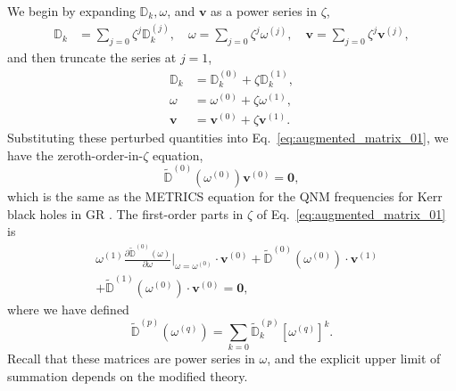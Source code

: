 \documentclass[aps,prx,amsmath,floats,floatfix,twocolumn,
  superscriptaddress,nofootinbib,showpacs]{revtex4-1}
\begin{document}
We begin by expanding $\mathbb{D}_k, \omega$, and $\textbf{v}$ as a power series in $\zeta$, 
\begin{equation}\label{eq:eigenperturbation_01}
\begin{split}
\mathbb{D}_k & = \sum_{j=0} \zeta^j \mathbb{D}^{(j)}_k, \quad
\omega  = \sum_{j=0} \zeta^j \omega^{(j)}, 
\quad
\textbf{v} = \sum_{j=0} \zeta^j \textbf{v}^{(j)}, 
\end{split}
\end{equation}
and then truncate the series at $j=1$, 
\begin{equation}\label{eq:eigenperturbation_02}
\begin{split}
\mathbb{D}_k & = \mathbb{D}^{(0)}_k + \zeta \mathbb{D}^{(1)}_k, \\
\omega & = \omega^{(0)} + \zeta \omega^{(1)}, \\
\textbf{v} & = \textbf{v}^{(0)} + \zeta \textbf{v}^{(1)}.  
\end{split}
\end{equation}
Substituting these perturbed quantities into Eq.~\eqref{eq:augmented_matrix_01}, we have the zeroth-order-in-$\zeta$ equation, 
\begin{equation}\label{eq:zeroth-zeta-order}
\tilde{\mathbb{D}}^{(0)} (\omega^{(0)}) \textbf{v}^{(0)} = \textbf{0}, 
\end{equation}
which is the same as the METRICS equation for the QNM frequencies for Kerr black holes in GR \cite{Chung:2023wkd}. The first-order parts in $\zeta$ of Eq.~\eqref{eq:augmented_matrix_01} is
\begin{equation}\label{eq:first-zeta-order}
\begin{split}
& \omega^{(1)} \frac{\partial \tilde{\mathbb{D}}^{(0)} (\omega)}{\partial \omega}\Big|_{\omega = \omega^{(0)}} \cdot \textbf{v}^{(0)} + \tilde{\mathbb{D}}^{(0)} (\omega^{(0)}) \cdot \textbf{v}^{(1)} \\
& + \tilde{\mathbb{D}}^{(1)} (\omega^{(0)}) \cdot  \textbf{v}^{(0)} = \textbf{0}, 
\end{split}
\end{equation}
where we have defined 
\begin{equation}
\tilde{\mathbb{D}}^{(p)} (\omega^{(q)}) = \sum_{k=0} \tilde{\mathbb{D}}^{(p)}_k \left[\omega^{(q)}\right]^k. 
\end{equation}
Recall that these matrices are power series in $\omega$, and the explicit upper limit of summation depends on the modified theory.
\end{document}

